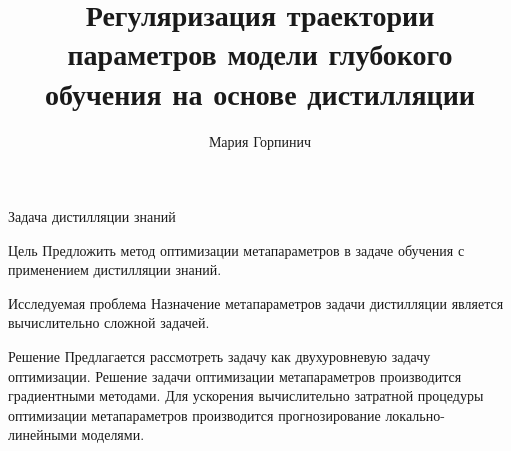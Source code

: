 \documentclass[10pt, aspectratio=169]{beamer}
\title[\hbox to 56mm{Оптимизация параметров модели на основе дистилляции знаний}]{Регуляризация траектории параметров модели глубокого обучения на основе дистилляции}
\author[М. Горипинич]{Мария Горпинич}
\institute{\fontsize{11}{14}\selectfontМосковский физико-технический институт}
\date{\footnotesize
\par\smallskip\emph{Курс:} Автоматизация научных исследований\par (практика, В.\,В.~Стрижов)/Группа 874
\par\smallskip\emph{Эксперт:} В.\,В.~Стрижов
\par\smallskip\emph{Консультант:} О.\,Ю.~Бахтеев
\par\bigskip\small 2021}
\begin{document}
\begin{frame}
\thispagestyle{empty}
\maketitle
\end{frame}
\begin{frame}{Задача дистилляции знаний}
\begin{block}{Цель}
    Предложить метод оптимизации метапараметров в задаче обучения с применением дистилляции знаний.
\end{block}
\begin{block}{Исследуемая проблема}
    Назначение метапараметров задачи дистилляции является вычислительно сложной задачей.
\end{block}
\begin{block}{Решение}
    Предлагается рассмотреть задачу как двухуровневую задачу оптимизации. Решение задачи оптимизации метапараметров производится градиентными методами. Для ускорения вычислительно затратной процедуры оптимизации метапараметров производится прогнозирование локально-линейными моделями.
\end{block}
\end{frame}
\end{document}
